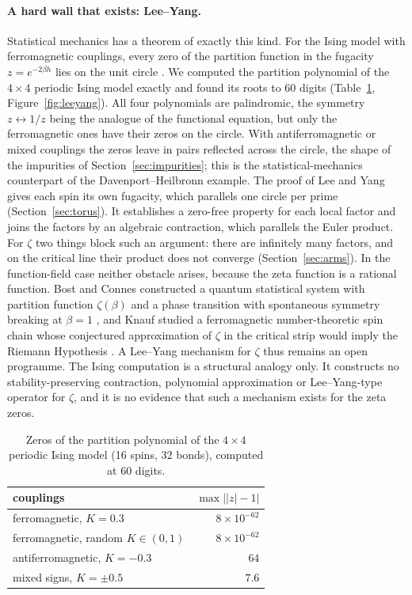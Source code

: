 \documentclass[11pt,a4paper]{article}
\theoremstyle{definition}\newtheorem{definition}[proposition]{Definition}
\theoremstyle{remark}\newtheorem{remark}[proposition]{Remark}
\begin{document}
\paragraph{A hard wall that exists: Lee--Yang.} Statistical mechanics has a theorem of exactly this kind. For the Ising model with ferromagnetic couplings, every zero of the partition function in the fugacity $z=e^{-2\beta h}$ lies on the unit circle \cite{LeeYang1952}. We computed the partition polynomial of the $4\times4$ periodic Ising model exactly and found its roots to $60$ digits (Table~\ref{tab:leeyang}, Figure~\ref{fig:leeyang}). All four polynomials are palindromic, the symmetry $z\leftrightarrow1/z$ being the analogue of the functional equation, but only the ferromagnetic ones have their zeros on the circle. With antiferromagnetic or mixed couplings the zeros leave in pairs reflected across the circle, the shape of the impurities of Section~\ref{sec:impurities}; this is the statistical-mechanics counterpart of the Davenport--Heilbronn example. The proof of Lee and Yang gives each spin its own fugacity, which parallels one circle per prime (Section~\ref{sec:torus}). It establishes a zero-free property for each local factor and joins the factors by an algebraic contraction, which parallels the Euler product. For $\zeta$ two things block such an argument: there are infinitely many factors, and on the critical line their product does not converge (Section~\ref{sec:arms}). In the function-field case neither obstacle arises, because the zeta function is a rational function. Bost and Connes constructed a quantum statistical system with partition function $\zeta(\beta)$ and a phase transition with spontaneous symmetry breaking at $\beta=1$ \cite{BostConnes1995}, and Knauf studied a ferromagnetic number-theoretic spin chain whose conjectured approximation of $\zeta$ in the critical strip would imply the Riemann Hypothesis \cite{Knauf1998}. A Lee--Yang mechanism for $\zeta$ thus remains an open programme. The Ising computation is a structural analogy only. It constructs no stability-preserving contraction, polynomial approximation or Lee--Yang-type operator for $\zeta$, and it is no evidence that such a mechanism exists for the zeta zeros.

\begin{table}[ht]\centering\small
\caption{Zeros of the partition polynomial of the $4\times4$ periodic Ising model (16 spins, 32 bonds), computed at $60$ digits.}\label{tab:leeyang}
\begin{tabular}{lr}
\toprule
couplings & $\max\bigl||z|-1\bigr|$\\
\midrule
ferromagnetic, $K=0.3$ & $8\times10^{-62}$\\
ferromagnetic, random $K\in(0,1)$ & $8\times10^{-62}$\\
antiferromagnetic, $K=-0.3$ & $64$\\
mixed signs, $K=\pm0.5$ & $7.6$\\
\bottomrule
\end{tabular}
\end{table}
\end{document}
